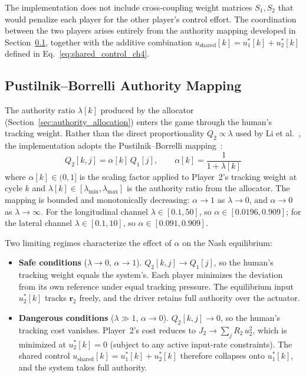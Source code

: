 \documentclass[12pt,a4paper,oneside]{report}
\begin{document}
The implementation does not include cross-coupling weight matrices $S_1, S_2$ that would penalize each player for the other player's control effort. The coordination between the two players arises entirely from the authority mapping developed in Section~\ref{sec:pustilnik_mapping}, together with the additive combination $u_{\text{shared}}[k] = u_1^{*}[k] + u_2^{*}[k]$ defined in Eq.~\eqref{eq:shared_control_ch4}.

\subsection{Pustilnik--Borrelli Authority Mapping}
\label{sec:pustilnik_mapping}

The authority ratio $\lambda[k]$ produced by the allocator (Section~\ref{sec:authority_allocation}) enters the game through the human's tracking weight. Rather than the direct proportionality $Q_2 \propto \lambda$ used by Li et al.~\cite{liSharedControlNovel2019}, the implementation adopts the Pustilnik--Borrelli mapping~\cite{pustilnikGeneralizedNashEquilibrium2025}:
\begin{equation}
Q_2[k, j] = \alpha[k] \, Q_1[j], \qquad \alpha[k] = \frac{1}{1 + \lambda[k]}
\label{eq:pustilnik_alpha}
\end{equation}
where $\alpha[k] \in (0, 1]$ is the scaling factor applied to Player~2's tracking weight at cycle $k$ and $\lambda[k] \in [\lambda_{\min}, \lambda_{\max}]$ is the authority ratio from the allocator. The mapping is bounded and monotonically decreasing: $\alpha \to 1$ as $\lambda \to 0$, and $\alpha \to 0$ as $\lambda \to \infty$. For the longitudinal channel $\lambda \in [0.1, 50]$, so $\alpha \in [0.0196, 0.909]$; for the lateral channel $\lambda \in [0.1, 10]$, so $\alpha \in [0.091, 0.909]$.

Two limiting regimes characterize the effect of $\alpha$ on the Nash equilibrium:
\begin{itemize}
\item \textbf{Safe conditions} ($\lambda \to 0$, $\alpha \to 1$). $Q_2[k, j] \to Q_1[j]$, so the human's tracking weight equals the system's. Each player minimizes the deviation from its own reference under equal tracking pressure. The equilibrium input $u_2^{*}[k]$ tracks $\mathbf{r}_2$ freely, and the driver retains full authority over the actuator.
\item \textbf{Dangerous conditions} ($\lambda \gg 1$, $\alpha \to 0$). $Q_2[k, j] \to 0$, so the human's tracking cost vanishes. Player~2's cost reduces to $J_2 \to \sum_j R_2 \, u_2^2$, which is minimized at $u_2^{*}[k] = 0$ (subject to any active input-rate constraints). The shared control $u_{\text{shared}}[k] = u_1^{*}[k] + u_2^{*}[k]$ therefore collapses onto $u_1^{*}[k]$, and the system takes full authority.
\end{itemize}
\end{document}
